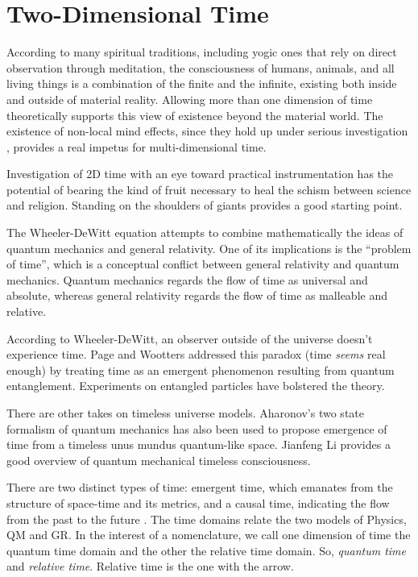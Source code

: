 \section{\label{sec:level1}Two-Dimensional Time}

According to many spiritual traditions, including yogic ones that rely on
direct observation through meditation, the consciousness of humans, animals,
and all living things is a combination of the finite and the infinite,
existing both inside and outside of material reality.
Allowing more than one dimension of time theoretically supports this view
of existence beyond the material world.
The existence of non-local mind effects, since they hold up under serious
investigation \cite{Kelly}, provides a real impetus for multi-dimensional time.

Investigation of 2D time with an eye toward practical instrumentation has the
potential of bearing the kind of fruit necessary to heal the schism between
science and religion.
Standing on the shoulders of giants provides a good starting point.

The Wheeler-DeWitt equation \cite{DeWitt} attempts to combine mathematically
the ideas of quantum mechanics and general relativity.
One of its implications is the ``problem of time'',
which is a conceptual conflict between general relativity and quantum mechanics.
Quantum mechanics regards the flow of time as universal and absolute, whereas
general relativity regards the flow of time as malleable and relative.

According to Wheeler-DeWitt, an observer outside of the universe
doesn't experience time. Page and Wootters \cite{Page} addressed this paradox
(time \textit{seems} real enough) by treating time as an emergent phenomenon
resulting from quantum entanglement.
Experiments \cite{Moreva} on entangled particles have bolstered the theory.

There are other takes on timeless universe models.
Aharonov's two state formalism of quantum mechanics has also been used
\cite{Lobo} to propose emergence of time from a timeless unus mundus
quantum-like space.
Jianfeng Li provides a good overview \cite{Jianfeng} of quantum mechanical
timeless consciousness.

There are two distinct types of time: emergent time, which emanates from the
structure of space-time and its metrics, and a causal time, indicating the flow
from the past to the future \cite{Brunet}. The time domains relate the
two models of Physics, QM and GR.
In the interest of a nomenclature, we call one dimension of time
the quantum time domain and the other the relative time domain.
So, \textit{quantum time} and \textit{relative time}.
Relative time is the one with the arrow.

